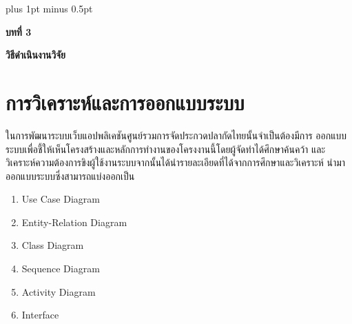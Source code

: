 
\clearpage
\thispagestyle{empty}

\begingroup
\fontsize{16pt}{19.2pt}\selectfont
\justifying
\XeTeXlinebreakskip=0pt plus 1pt minus 0.5pt
\setlength{\parindent}{1.5cm}
\setlength{\parskip}{0pt}

{}
\begin{center}
	{\bfseries\fontsize{18pt}{21.6pt}\selectfont บทที่ 3}
\end{center}

\vspace{\baselineskip}

\begin{center}
	{\bfseries\fontsize{18pt}{21.6pt}\selectfont วิธีดำเนินงานวิจัย}
\end{center}

\vspace{\baselineskip}

\section*{การวิเคราะห์และการออกแบบระบบ}

\indent ในการพัฒนาระบบเว็บแอปพลิเคชันศูนย์รวมการจัดประกวดปลากัดไทยนั้นจำเป็นต้องมีการ
ออกแบบระบบเพื่อชี้ให้เห็นโครงสร้างและหลักการทำงานของโครงงานนี้โดยผู้จัดทำได้ศึกษาค้นคว้า
และวิเคราะห์ความต้องการขิงผู้ใช้งานระบบจากนั้นได้นำรายละเอียดที่ได้จากการศึกษาและวิเคราะห์
นำมาออกแบบระบบซึ่งสามารถแบ่งออกเป็น

\setlength{\LoneLabelSep}{0.5em}
\settowidth{\LoneLabelWidth}{9.}
\setlength{\LoneContentCol}{\dimexpr 1.5cm + \LoneLabelWidth + \LoneLabelSep\relax}

\setlength{\LtwoLabelSep}{0.5em}
\settowidth{\LtwoLabelWidth}{9.9.}
\setlength{\ExtraAlign}{-2.8em}


\begin{enumerate}
	\item Use Case Diagram
	\item Entity-Relation Diagram
	\item Class Diagram
	\item Sequence Diagram
	\item Activity Diagram
	\item Interface
\end{enumerate}

\clearpage